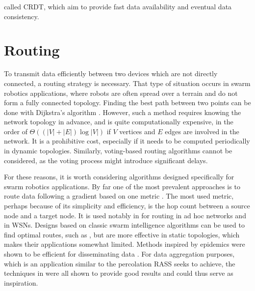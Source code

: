 called \ac{CRDT}, which aim to provide fast data availability and eventual data consistency.

\section{Routing}
To transmit data efficiently between two devices which are not directly connected, a routing strategy is necessary. That type of situation occurs in swarm robotics applications, where robots are often spread over a terrain and do not form a fully connected topology. Finding the best path between two points can be done with Dijkstra's algorithm \cite{dijkstra1959note}. However, such a method requires knowing the network topology in advance, and is quite computationally expensive, in the order of $\Theta((|V|+|E|)\log|V|)$ if $V$ vertices and $E$ edges are involved in the network. It is a prohibitive cost, especially if it needs to be computed periodically in dynamic topologies. Similarly, voting-based routing algorithms cannot be considered, as the voting process might introduce significant delays.

For these reasons, it is worth considering algorithms designed specifically for swarm robotics applications. By far one of the most prevalent approaches is to route data following a gradient based on one metric \cite{draves2004comparison,watteyne2009implementation}. The most used metric, perhaps because of its simplicity and efficiency, is the hop count between a source node and a target node. It is used notably in \cite{watteyne2009implementation,kuruvila2005hop,zhang2014efficient,al2019efficient} for routing in ad hoc networks and in \ac{WSN}s. Designs based on classic swarm intelligence algorithms can be used to find optimal routes, such as \cite{li2011slime,jiang2018toward,jiang2018effective,liao2008data,tolstaya2021learning}, but are more effective in static topologies, which makes their applications somewhat limited. Methods inspired by epidemics were shown to be efficient for disseminating data \cite{ganesan2002empirical,hui2004dynamic}. For data aggregation purposes, which is an application similar to the percolation \ac{RASS} seeks to achieve, the techniques in  \cite{jiang2018effective,liao2008data,dhand2016data} were all shown to provide good results and could thus serve as inspiration.

